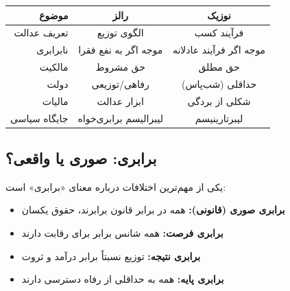 \vspace{-10pt}

\begin{comparebox}
	\vspace{-4pt}
	\begin{table}[H]
		\centering
		\setlength{\tabcolsep}{4pt}
		\begin{tabular}{r|c|c}
			\toprule
			\textbf{موضوع} & \textbf{رالز} & \textbf{نوزیک} \\
			\midrule
			تعریف عدالت & الگوی توزیع & فرآیند کسب \\
			نابرابری & موجه اگر به نفع فقرا & موجه اگر فرآیند عادلانه \\
			مالکیت & حق مشروط & حق مطلق \\
			دولت & رفاهی/توزیعی & حداقلی (شب‌پاس) \\
			مالیات & ابزار عدالت & شکلی از بردگی \\
			جایگاه سیاسی & لیبرالیسم برابری‌خواه & لیبرتارینیسم \\
			\bottomrule
		\end{tabular}
	\end{table}
	\vspace{-6pt}
\end{comparebox}

\subsection{برابری: صوری یا واقعی؟}

یکی از مهم‌ترین اختلافات درباره معنای «برابری» است:

\begin{defbox}
	\begin{itemize}[nosep]
		\item \textbf{برابری صوری (قانونی):} همه در برابر قانون برابرند، حقوق یکسان
		\item \textbf{برابری فرصت:} همه شانس برابر برای رقابت دارند
		\item \textbf{برابری نتیجه:} توزیع نسبتاً برابر درآمد و ثروت
		\item \textbf{برابری پایه:} همه به حداقلی از رفاه دسترسی دارند
	\end{itemize}
\end{defbox}


